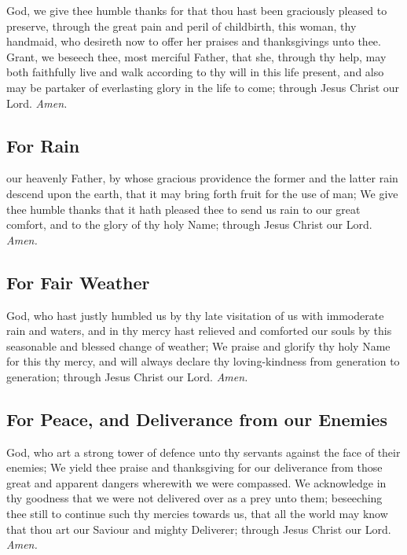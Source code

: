  God, we give thee humble thanks for that thou hast been graciously pleased to preserve, through the great pain and peril of childbirth, this woman, thy handmaid, who desireth now to offer her praises and thanksgivings unto thee. Grant, we beseech thee, most merciful Father, that she, through thy help, may both faithfully live and walk according to thy will in this life present, and also may be partaker of everlasting glory in the life to come; through Jesus Christ our Lord. \textit{Amen.}

\subsection{For Rain}
 our heavenly Father, by whose gracious providence the former and the latter rain descend upon the earth, that it may bring forth fruit for the use of man; We give thee humble thanks that it hath pleased thee to send us rain to our great comfort, and to the glory of thy holy Name; through Jesus Christ our Lord. \textit{Amen.}

\clearpage
\subsection{For Fair Weather}
 God, who hast justly humbled us by thy late visitation of us with immoderate rain and waters, and in thy mercy hast relieved and comforted our souls by this seasonable and blessed change of weather; We praise and glorify thy holy Name for this thy mercy, and will always declare thy loving-kindness from generation to generation; through Jesus Christ our Lord. \textit{Amen.}

\subsection{For Peace, and Deliverance from our Enemies}
 God, who art a strong tower of defence unto thy servants against the face of their enemies; We yield thee praise and thanksgiving for our deliverance from those great and apparent dangers wherewith we were compassed. We acknowledge in thy goodness that we were not delivered over as a prey unto them; beseeching thee still to continue such thy mercies towards us, that all the world may know that thou art our Saviour and mighty Deliverer; through Jesus Christ our Lord. \textit{Amen.}

